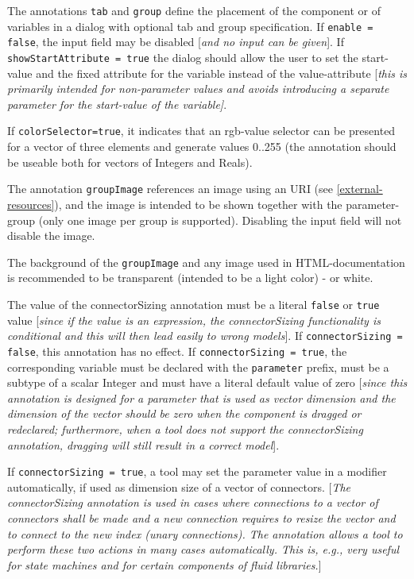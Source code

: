The annotations \lstinline!tab! and \lstinline!group! define the placement of
the component or of variables in a dialog with optional tab and group
specification. If \lstinline!enable = false!, the input field may
be disabled {[}\emph{and no input can be given}{]}. If
\lstinline!showStartAttribute = true! the dialog should allow the user to
set the start-value and the fixed attribute for the variable instead of
the value-attribute {[}\emph{this is primarily intended for
non-parameter values and avoids introducing a separate parameter for the
start-value of the variable{]}}.

If \lstinline!colorSelector=true!, it indicates that an rgb-value selector can be
presented for a vector of three elements and generate values 0..255 (the
annotation should be useable both for vectors of Integers and Reals).

The annotation \lstinline!groupImage! references an image using an URI (see
\autoref{external-resources}), and the image is intended to be shown together with the
parameter-group (only one image per group is supported). Disabling the
input field will not disable the image.

The background of the \lstinline!groupImage! and any image used in HTML-documentation is recommended to be transparent (intended to be a light color) - or white.

The value of the connectorSizing annotation must be a literal
\lstinline!false! or \lstinline!true! value {[}\emph{since if the value is an
expression, the connectorSizing functionality is conditional and this
will then lead easily to wrong models}{]}. If \lstinline!connectorSizing = false!, this annotation has no effect.
If \lstinline!connectorSizing = true!, the corresponding variable must be declared with the
\lstinline!parameter! prefix, must be a subtype of a scalar Integer and
must have a literal default value of zero {[}\emph{since this annotation
is designed for a parameter that is used as vector dimension and the
dimension of the vector should be zero when the component is dragged or
redeclared; furthermore, when a tool does not support the
connectorSizing annotation, dragging will still result in a correct
model}{]}.

If \lstinline!connectorSizing = true!, a tool may set the parameter value
in a modifier automatically, if used as dimension size of a vector of
connectors. {[}\emph{The connectorSizing annotation is used in cases
where connections to a vector of connectors shall be made and a new
connection requires to resize the vector and to connect to the new index
(unary connections). The annotation allows a tool to perform these two
actions in many cases automatically. This is, e.g., very useful for
state machines and for certain components of fluid libraries.}{]}

